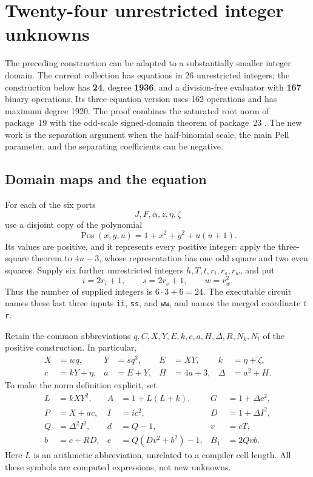 \section{Twenty-four unrestricted integer unknowns}
\label{sec:integer}

The preceding construction can be adapted to a substantially smaller
integer domain. The current collection has equations in 26 unrestricted
integers; the construction below has \textbf{24}, degree \textbf{1936},
and a division-free evaluator with \textbf{167} binary operations. Its
three-equation version uses 162 operations and has maximum degree 1920.
The proof combines the saturated root norm of package~19 with the odd-scale
signed-domain theorem of package~23 \cite{repo19,repo23,oddscale}.
The new work is the separation argument when the half-binomial scale, the
main Pell parameter, and the separating coefficients can be negative.

\subsection{Domain maps and the equation}

For each of the six ports
\[
 J,F,\alpha,z,\eta,\zeta
\]
use a disjoint copy of the polynomial
\[
 \operatorname{Pos}(x,y,u)=1+x^2+y^2+u(u+1).
\]
Its values are positive, and it represents every positive integer:
apply the three-square theorem to $4n-3$, whose representation has one
odd square and two even squares. Supply six further unrestricted integers
$h,T,t,r_i,r_s,r_w$, and put
\begin{equation}\label{eq:integer-domain}
 i=2r_i+1,\qquad s=2r_s+1,\qquad w=r_w^2.
\end{equation}
Thus the number of supplied integers is $6\cdot3+6=24$.
The executable circuit names these last three inputs \texttt{ii},
\texttt{ss}, and \texttt{ww}, and names the merged coordinate $t$
\texttt{r}.

Retain the common abbreviations $q,C,X,Y,E,k,c,a,H,\Delta,R,N_k,N_t$
of the positive construction. In particular,
\begin{align*}
 X&=wq,&Y&=sq^3,&E&=XY,&k&=\eta+\zeta,\\
 c&=kY+\eta,&a&=E+Y,&H&=4a+3,&\Delta&=a^2+H.
\end{align*}
To make the norm definition explicit, set
\begin{align*}
 L&=kXY^2,& A&=1+L(L+k),&G&=1+\Delta c^2,\\
 P&=X+ac,&I&=ic^2,&D&=1+\Delta I^2,\\
 Q&=\Delta^2I^2,&d&=Q-1,&v&=cT,\\
 b&=c+RD,&e&=Q(Dv^2+b^2)-1,&B_1&=2Qvb.
\end{align*}
Here $L$ is an arithmetic abbreviation, unrelated to a compiler cell
length. All these symbols are computed expressions, not new unknowns.


